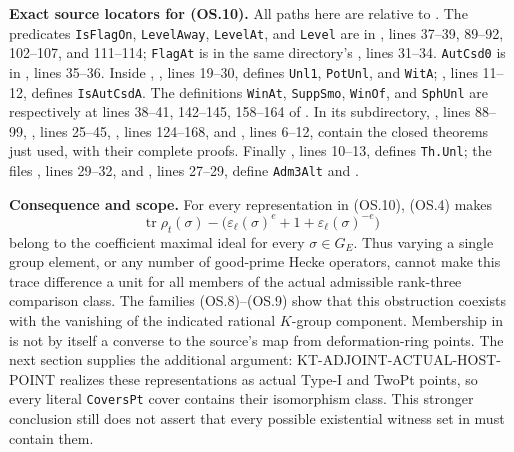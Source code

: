 \documentclass[11pt,a4paper]{article}
\theoremstyle{definition}
\renewcommand{\paragraph}[1]{\par\smallskip\noindent\textbf{#1}\quad\ignorespaces}
\begin{document}
\paragraph{Exact source locators for (OS.10).}
All paths here are relative to
.
The predicates \texttt{IsFlagOn}, \texttt{LevelAway},
\texttt{LevelAt}, and \texttt{Level} are in
, lines 37--39,
89--92, 102--107, and 111--114;
\texttt{FlagAt} is in the same directory's
, lines 31--34.
\texttt{AutCsd0} is in
, lines 35--36.
Inside ,
, lines 19--30,
defines \texttt{Unl1}, \texttt{PotUnl}, and \texttt{WitA};
, lines 11--12,
defines \texttt{IsAutCsdA}.
The definitions \texttt{WinAt}, \texttt{SuppSmo},
\texttt{WinOf}, and \texttt{SphUnl} are respectively at
lines 38--41, 142--145, 158--164 of
.
In its  subdirectory,
, lines 88--99,
, lines 25--45,
, lines 124--168, and
, lines 6--12, contain the closed
theorems just used, with their complete proofs.
Finally , lines 10--13,
defines \texttt{Th.Unl}; the
 files ,
lines 29--32, and , lines 27--29,
define \texttt{Adm3Alt} and .

\paragraph{Consequence and scope.}
For every representation in (OS.10), (OS.4) makes
\[
 \operatorname{tr}\rho_t(\sigma)
  -\bigl(\varepsilon_\ell(\sigma)^e+1+
                         \varepsilon_\ell(\sigma)^{-e}\bigr)
\]
belong to the coefficient maximal ideal for every
$\sigma\in G_E$. Thus varying a single group element,
or any number of good-prime Hecke operators, cannot make
this trace difference a unit for all members of the
actual admissible rank-three comparison class.
The families (OS.8)--(OS.9) show that this obstruction
coexists with the vanishing of the indicated rational
$K$-group component.
Membership in  is not by itself a converse
to the source's map from deformation-ring points.
The next section supplies the additional argument:
KT-ADJOINT-ACTUAL-HOST-POINT realizes these representations
as actual Type-I and TwoPt points, so every literal
\texttt{CoversPt} cover contains their isomorphism class.
This stronger conclusion still does not assert that every
possible existential witness set in 
must contain them.
\end{document}
